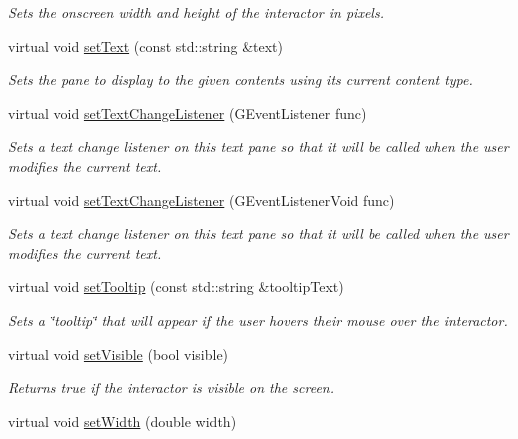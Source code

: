 \begin{DoxyCompactItemize}
\begin{DoxyCompactList}\small\item\em Sets the onscreen width and height of the interactor in pixels. \end{DoxyCompactList}\item 
virtual void \mbox{\hyperlink{classGBrowserPane_ac1ae51949d41ee9054634be5967d91b8}{set\+Text}} (const std\+::string \&text)
\begin{DoxyCompactList}\small\item\em Sets the pane to display to the given contents using its current content type. \end{DoxyCompactList}\item 
virtual void \mbox{\hyperlink{classGBrowserPane_ae41284f9c540110180ac0ad6beca5cb0}{set\+Text\+Change\+Listener}} (G\+Event\+Listener func)
\begin{DoxyCompactList}\small\item\em Sets a text change listener on this text pane so that it will be called when the user modifies the current text. \end{DoxyCompactList}\item 
virtual void \mbox{\hyperlink{classGBrowserPane_ae8df75b0746951146d29220f386fcd33}{set\+Text\+Change\+Listener}} (G\+Event\+Listener\+Void func)
\begin{DoxyCompactList}\small\item\em Sets a text change listener on this text pane so that it will be called when the user modifies the current text. \end{DoxyCompactList}\item 
virtual void \mbox{\hyperlink{classGInteractor_a039e0e49beaecc275efce02d416acea8}{set\+Tooltip}} (const std\+::string \&tooltip\+Text)
\begin{DoxyCompactList}\small\item\em Sets a \char`\"{}tooltip\char`\"{} that will appear if the user hovers their mouse over the interactor. \end{DoxyCompactList}\item 
virtual void \mbox{\hyperlink{classGInteractor_a18e44e30b31525a243960ca3928125aa}{set\+Visible}} (bool visible)
\begin{DoxyCompactList}\small\item\em Returns true if the interactor is visible on the screen. \end{DoxyCompactList}\item 
virtual void \mbox{\hyperlink{classGInteractor_aa3f3fba4cb131baa8696ba01e3bceca1}{set\+Width}} (double width)

\end{DoxyCompactItemize}
